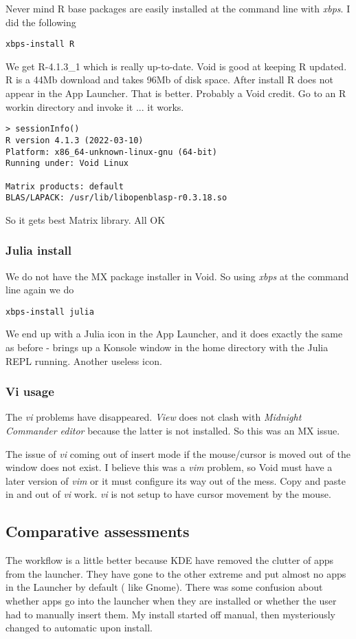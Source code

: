 \documentclass{article}  %
\begin{document}
Never mind R  base packages are easily installed at the command line with {\em xbps}. I did the following
\begin{verbatim}
xbps-install R
\end{verbatim}
We get R-4.1.3\_1 which is really up-to-date. Void is good at keeping R updated. 
R is a 44Mb download and takes 96Mb of disk space.
After install R does not appear in the App Launcher. That is better. Probably a Void credit. Go to an R workin directory and invoke it ... it works.
\begin{verbatim}
> sessionInfo()
R version 4.1.3 (2022-03-10)
Platform: x86_64-unknown-linux-gnu (64-bit)
Running under: Void Linux

Matrix products: default
BLAS/LAPACK: /usr/lib/libopenblasp-r0.3.18.so
\end{verbatim}
So it gets best Matrix library. All OK

\subsubsection{Julia install}
We do not have the MX package installer in Void. So using {\em xbps} at the command line  again we do
\begin{verbatim}
xbps-install julia
\end{verbatim}
We end up with a Julia icon in the App Launcher, and it does exactly the same as before - brings up a Konsole window in the home directory with the Julia REPL running. Another useless icon.

\subsubsection{Vi usage}
The {\em vi} problems have disappeared. {\em View} does not clash with {\em Midnight Commander editor} because the latter is not installed. So this was an MX issue.

The issue of {\em vi} coming out of insert mode if the mouse/cursor is moved out of the window does not exist. I believe this was a {\em vim} problem, so Void must have a later version of {\em vim} or it must configure its way out of the mess. Copy and paste in and out of {\em vi} work. {\em vi} is not setup to have cursor movement by the mouse.

\subsection{Comparative assessments}
The workflow is a little better because KDE have removed the clutter of apps from the launcher. They have gone to the other extreme and put almost no apps in the Launcher by default ( like Gnome). There was some confusion about whether apps go into the launcher when they are installed or whether the user had to manually insert them. My install started off manual, then mysteriously changed to automatic upon install.
\end{document}
